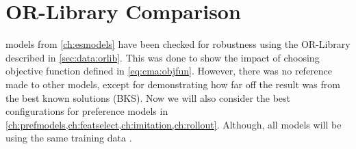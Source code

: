 

\chapter{OR-Library Comparison}\label{ch:experiments} 

 models from 
\cref{ch:esmodels} have been checked for robustness using the OR-Library 
described in \cref{sec:data:orlib}. This was done to show the 
impact of choosing objective function defined in \cref{eq:cma:objfun}. 
However, there was no reference made to other models, except for demonstrating 
how far off the result was from the best known solutions (BKS).
Now we will also consider the best configurations for preference models in 
\cref{ch:prefmodels,ch:featselect,ch:imitation,ch:rollout}.
Although, all models will be using the same training data .

